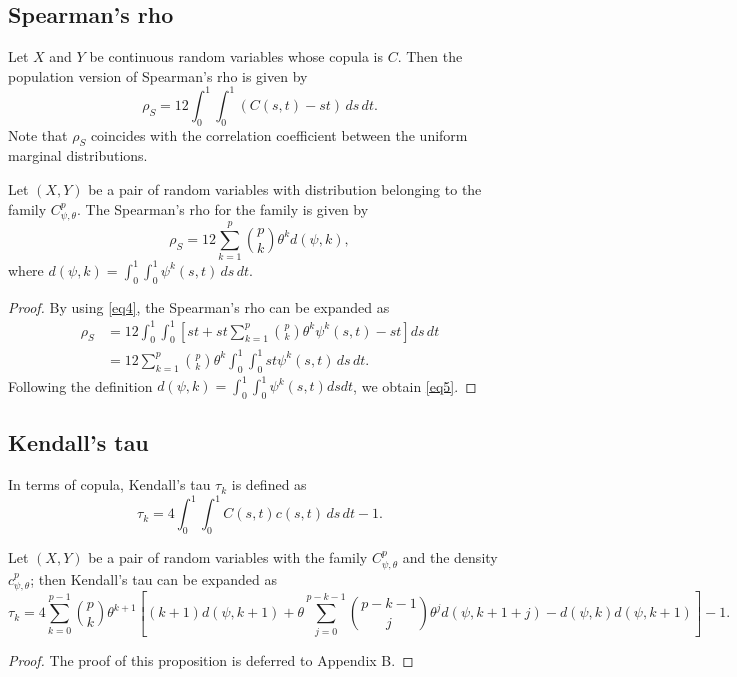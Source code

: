 \documentclass[twoside]{article}
\numberwithin{equation}{section}
\begin{document}
\subsection{Spearman's rho}
Let $X$ and $Y$ be continuous random variables whose copula is $C$. Then the population version of Spearman's rho is given by
\begin{equation}
\rho_S = 12 \int_0^1 \int_0^1 (C(s,t) - st) \, ds \, dt.
\end{equation}
Note that $\rho_S$ coincides with the correlation coefficient between the uniform marginal distributions.

\begin{pro}\label{pr3}
Let $(X,Y)$ be a pair of random variables with distribution belonging to the family $C_{\psi,\theta}^p$. The Spearman's rho for the family is given by
\begin{equation}\label{eq5}
\rho_S = 12 \sum_{k=1}^{p} \binom{p}{k} \theta^k d(\psi, k),
\end{equation}
where $d(\psi, k) = \int_0^1 \int_0^1 \psi^k(s,t) \, ds \, dt$.
\end{pro}
\begin{proof}
By using \eqref{eq4}, the Spearman's rho can be expanded as
\begin{align*}
\rho_S &= 12 \int_0^1 \int_0^1 \left[ st + st \sum_{k=1}^{p} \binom{p}{k} \theta^k \psi^k(s,t) - st \right] ds \, dt \\
&= 12 \sum_{k=1}^{p} \binom{p}{k} \theta^k \int_0^1 \int_0^1 st \psi^k(s,t) \, ds \, dt.
\end{align*}
Following the definition $d(\psi,k) = \int_0^1 \int_0^1 \psi^k(s,t) ds dt$, we obtain \eqref{eq5}.
\end{proof}

\subsection{Kendall's tau}
In terms of copula, Kendall's tau $\tau_k$ is defined as \cite{Nelsen2006}
\begin{equation}
\tau_k = 4 \int_0^1 \int_0^1 C(s,t) c(s,t) \, ds \, dt - 1.
\end{equation}

\begin{pro}\label{pr4}
Let $(X,Y)$ be a pair of random variables with the family $C_{\psi,\theta}^p$ and the density $c_{\psi,\theta}^p$; then Kendall's tau can be expanded as
\begin{equation}\label{eq6}
\tau_k = 4 \sum_{k=0}^{p-1} \binom{p}{k} \theta^{k+1} \left[ (k+1)d(\psi, k+1) + \theta \sum_{j=0}^{p-k-1} \binom{p-k-1}{j} \theta^j d(\psi, k+1+j) - d(\psi, k) d(\psi, k+1) \right] - 1.
\end{equation}
\end{pro}
\begin{proof}
The proof of this proposition is deferred to Appendix B.
\end{proof}
\end{document}
